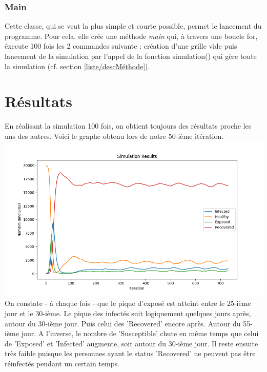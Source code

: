 \documentclass[french]{article}
\begin{document}


\subsubsection{Main}
Cette classe, qui se veut la plus simple et courte possible, permet le lancement du programme. Pour cela, elle crée une méthode \textit{main} qui, à travers une boucle for, éxecute 100 fois les 2 commandes suivante : création d'une grille vide puis lancement de la simulation par l'appel de la fonction simulation() qui gère toute la simulation (cf. section \ref{liste/descMéthode}).



\section{Résultats}
En réalisant la simulation 100 fois, on obtient toujours des résultats proche les uns des autres. Voici le graphe obtenu lors de notre 50-ième itération. \newline
\includegraphics[scale=0.5]{./simulation_results_png/simulation_results_50.png} On constate - à chaque fois - que le pique d'exposé est atteint entre le 25-ième jour et le 30-ième. Le pique des infectés suit logiquement quelques jours après, autour du 30-ième jour. Puis celui des 'Recovered' encore après. Autour du 55-ième jour. A l'inverse, le nombre de 'Susceptible' chute en même temps que celui de 'Exposed' et 'Infected' augmente, soit autour du 30-ième jour. Il reste ensuite très faible puisque les personnes ayant le status 'Recovered' ne peuvent pas être réinfectés pendant un certain temps.
\end{document}
